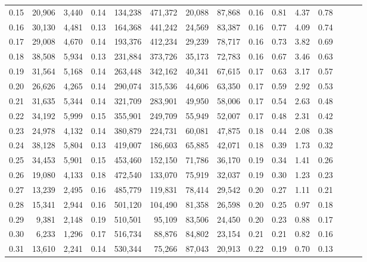 \begin{tabular}{rrrrrrrrrrrrrrr}
0.15 &  20,906 &  3,440 &  0.14 &  134,238 &  471,372 &   20,088 &   87,868 &  0.16 &  0.81 &  4.37 &      0.78 \\
0.16 &  30,130 &  4,481 &  0.13 &  164,368 &  441,242 &   24,569 &   83,387 &  0.16 &  0.77 &  4.09 &      0.74 \\
0.17 &  29,008 &  4,670 &  0.14 &  193,376 &  412,234 &   29,239 &   78,717 &  0.16 &  0.73 &  3.82 &      0.69 \\
0.18 &  38,508 &  5,934 &  0.13 &  231,884 &  373,726 &   35,173 &   72,783 &  0.16 &  0.67 &  3.46 &      0.63 \\
0.19 &  31,564 &  5,168 &  0.14 &  263,448 &  342,162 &   40,341 &   67,615 &  0.17 &  0.63 &  3.17 &      0.57 \\
0.20 &  26,626 &  4,265 &  0.14 &  290,074 &  315,536 &   44,606 &   63,350 &  0.17 &  0.59 &  2.92 &      0.53 \\
0.21 &  31,635 &  5,344 &  0.14 &  321,709 &  283,901 &   49,950 &   58,006 &  0.17 &  0.54 &  2.63 &      0.48 \\
0.22 &  34,192 &  5,999 &  0.15 &  355,901 &  249,709 &   55,949 &   52,007 &  0.17 &  0.48 &  2.31 &      0.42 \\
0.23 &  24,978 &  4,132 &  0.14 &  380,879 &  224,731 &   60,081 &   47,875 &  0.18 &  0.44 &  2.08 &      0.38 \\
0.24 &  38,128 &  5,804 &  0.13 &  419,007 &  186,603 &   65,885 &   42,071 &  0.18 &  0.39 &  1.73 &      0.32 \\
0.25 &  34,453 &  5,901 &  0.15 &  453,460 &  152,150 &   71,786 &   36,170 &  0.19 &  0.34 &  1.41 &      0.26 \\
0.26 &  19,080 &  4,133 &  0.18 &  472,540 &  133,070 &   75,919 &   32,037 &  0.19 &  0.30 &  1.23 &      0.23 \\
0.27 &  13,239 &  2,495 &  0.16 &  485,779 &  119,831 &   78,414 &   29,542 &  0.20 &  0.27 &  1.11 &      0.21 \\
0.28 &  15,341 &  2,944 &  0.16 &  501,120 &  104,490 &   81,358 &   26,598 &  0.20 &  0.25 &  0.97 &      0.18 \\
0.29 &   9,381 &  2,148 &  0.19 &  510,501 &   95,109 &   83,506 &   24,450 &  0.20 &  0.23 &  0.88 &      0.17 \\
0.30 &   6,233 &  1,296 &  0.17 &  516,734 &   88,876 &   84,802 &   23,154 &  0.21 &  0.21 &  0.82 &      0.16 \\
0.31 &  13,610 &  2,241 &  0.14 &  530,344 &   75,266 &   87,043 &   20,913 &  0.22 &  0.19 &  0.70 &      0.13 \\

\end{tabular}
